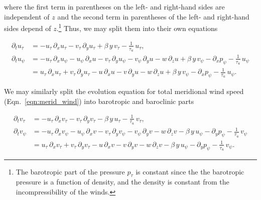 where the first term in parentheses on the left- and right-hand sides are independent of $z$ and the second term in parentheses of the left- and right-hand sides depend of $z$.\footnote{The barotropic part of the pressure $p_{\tau}$ is constant since the the barotropic pressure is a function of density, and the density is constant from the incompressibility of the winds.} Thus, we may split them into their own equations

\begin{subequations}
	\begin{align}
		\partial_t u_{\tau}  &= - u_{\tau}\,\partial_x u_{\tau} - v_{\tau}\,\partial_y u_{\tau} + \beta\,y\,v_{\tau} - \frac{1}{\tau_u}\,u_{\tau}, \label{eqn:evol_trop_u} \\
		\partial_t u_{\psi} &= - u_{\tau}\,\partial_x u_{\psi} - u_{\psi}\,\partial_x u - v_{\tau}\,\partial_y u_{\psi} - v_{\psi}\,\partial_y u - w\,\partial_z u + \beta\,y\,v_{\psi} - \partial_x p_{\psi} - \frac{1}{\tau_u}\,u_{\psi} \nonumber \\
			&= u_{\tau}\,\partial_x u_{\tau} + v_{\tau}\,\partial_y u_{\tau} - u\,\partial_x u - v\,\partial_y u - w\,\partial_z u + \beta\,y\,v_{\psi} - \partial_x p_{\psi} - \frac{1}{\tau_u}\,u_{\psi}. \label{eqn:evol_clin_u}
	\end{align}
\end{subequations}

We may similarly split the evolution equation for total meridional wind speed (Eqn.~\ref{eqn:merid_wind}) into barotropic and baroclinic parts

\begin{subequations}
	\begin{align}
		\partial_t v_{\tau}  &= - u_{\tau}\,\partial_x v_{\tau} - v_{\tau}\,\partial_y v_{\tau} - \beta\,y\,u_{\tau} - \frac{1}{\tau_u}\,v_{\tau}, \label{eqn:evol_trop_v} \\
		\partial_t v_{\psi} &= - u_{\tau}\,\partial_x v_{\psi} - u_{\psi}\,\partial_x v - v_{\tau}\,\partial_y v_{\psi} - v_{\psi}\,\partial_y v - w\,\partial_z v - \beta\,y\,u_{\psi} - \partial_y p_{\psi} - \frac{1}{\tau_u}\,v_{\psi} \nonumber \\
			&= u_{\tau}\,\partial_x v_{\tau} + v_{\tau}\,\partial_y v_{\tau} - u\,\partial_x v - v\,\partial_y v - w\,\partial_z v - \beta\,y\,u_{\psi} - \partial_y p_{\psi} - \frac{1}{\tau_u}\,v_{\psi}. \label{eqn:evol_clin_v}
	\end{align}
\end{subequations}

